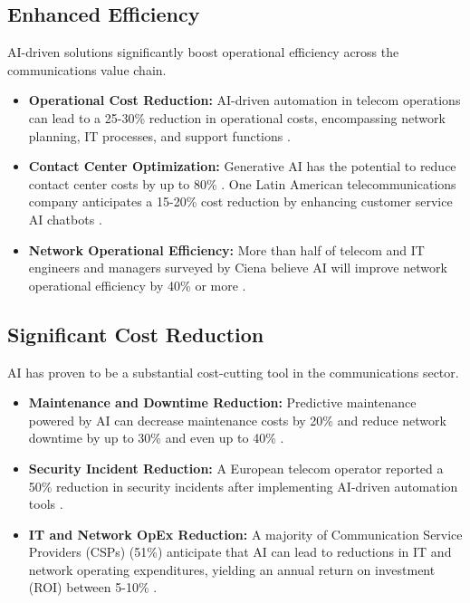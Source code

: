 \subsection{Enhanced Efficiency}
AI-driven solutions significantly boost operational efficiency across the communications value chain.
\begin{itemize}
    \item \textbf{Operational Cost Reduction:} AI-driven automation in telecom operations can lead to a 25-30\% reduction in operational costs, encompassing network planning, IT processes, and support functions \cite{Processica_Benefits}.
    \item \textbf{Contact Center Optimization:} Generative AI has the potential to reduce contact center costs by up to 80\% \cite{TBRI_Benefits}. One Latin American telecommunications company anticipates a 15-20\% cost reduction by enhancing customer service AI chatbots \cite{McKinsey_Benefits}.
    \item \textbf{Network Operational Efficiency:} More than half of telecom and IT engineers and managers surveyed by Ciena believe AI will improve network operational efficiency by 40\% or more \cite{RCRWireless_Benefits}.
\end{itemize}

\subsection{Significant Cost Reduction}
AI has proven to be a substantial cost-cutting tool in the communications sector.
\begin{itemize}
    \item \textbf{Maintenance and Downtime Reduction:} Predictive maintenance powered by AI can decrease maintenance costs by 20\% and reduce network downtime by up to 30\% \cite{Processica_Benefits} and even up to 40\% \cite{Veritis_Benefits}.
    \item \textbf{Security Incident Reduction:} A European telecom operator reported a 50\% reduction in security incidents after implementing AI-driven automation tools \cite{Processica_Benefits}.
    \item \textbf{IT and Network OpEx Reduction:} A majority of Communication Service Providers (CSPs) (51\%) anticipate that AI can lead to reductions in IT and network operating expenditures, yielding an annual return on investment (ROI) between 5-10\% \cite{RCRWireless_Benefits}.
\end{itemize}

